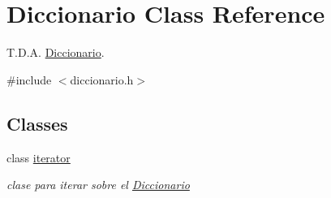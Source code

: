 \hypertarget{classDiccionario}{}\section{Diccionario Class Reference}
\label{classDiccionario}


T.\+D.\+A. \mbox{\hyperlink{classDiccionario}{Diccionario}}.  




{\ttfamily \#include $<$diccionario.\+h$>$}

\subsection*{Classes}
\begin{DoxyCompactItemize}
\item 
class \mbox{\hyperlink{classDiccionario_1_1iterator}{iterator}}
\begin{DoxyCompactList}\small\item\em clase para iterar sobre el \mbox{\hyperlink{classDiccionario}{Diccionario}} \end{DoxyCompactList}\end{DoxyCompactItemize}
